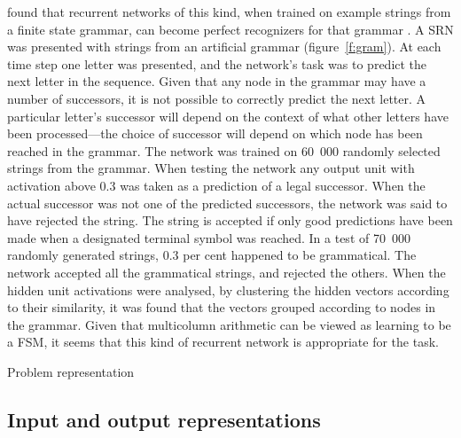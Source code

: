 found that recurrent networks of this kind, when trained on
example strings from a finite state grammar, can become perfect recognizers
for that grammar \cite<see also>{servenco,servgrad,alleconn,elmafind}. A
SRN was presented with strings from an artificial grammar
(figure~\ref{f:gram}). At each time step one letter was presented, and the
network's task was to predict the next letter in the sequence.  Given that
any node in the grammar may have a number of successors, it is not possible
to correctly predict the next letter.  A particular letter's
successor will depend on the context of what other letters have been
processed---the choice of successor
will depend on which node has been reached in the
grammar.  The network was trained on 60~000 randomly selected strings from
the grammar.  When testing the network any output unit with activation
above 0.3 was taken as a prediction of a legal successor.  When the actual
successor was not one of the predicted successors, the network was said to
have rejected the string.  The string is accepted if only good
predictions have
been made when a designated terminal symbol was reached. In a test of
70~000 randomly generated strings, 0.3 per cent happened to be grammatical.
The network accepted all the grammatical strings, and rejected the others.
When the hidden unit activations were analysed, by clustering the hidden
vectors according to their similarity, it was found that the vectors
grouped according to nodes in the grammar.
Given that
multicolumn arithmetic can be
viewed as learning to be a FSM, it seems that this kind of recurrent
network is appropriate for the task.

\begin{fancyfigure}
\centerline{}
\caption{Problem representation}
\label{f:eye}
\end{fancyfigure}

\subsection{Input and output representations}

